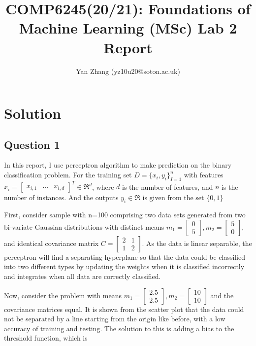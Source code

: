 \documentclass[10pt]{article}
\begin{document}
\title{\huge{COMP6245(20/21): Foundations of Machine Learning (MSc) Lab 2 Report}}
\author{\normalsize{Yan Zhang (yz10u20@soton.ac.uk)}}
\date{}
\maketitle

\section{Solution}
\subsection{Question 1}
In this report, I use perceptron algorithm to make prediction on the binary classification problem. For the training set $ D = \big\{x_i,y_i\big\} _{I=1}^{n}$ with features $x_i =  \begin{bmatrix}x_{i,1}&... &x_{i,d}  \end{bmatrix}^T \in  \Re ^d$, where $d$ is the number of features, and $n$ is the number of instances. And the outputs $y_i \in \Re$ is given from the set $\big\{0,1\big\}$

First, consider sample with n=100 comprising two data sets generated from two bi-variate Gaussian distributions with distinct means $m_1 = \begin{bmatrix}0 \\ 5\end{bmatrix}, m_2= \begin{bmatrix}5 \\ 0 \end{bmatrix}$, and identical covariance matrix $C = \begin{bmatrix} 2 & 1\\ 1 & 2\end{bmatrix}$. As the data is linear separable, the perceptron will find a separating hyperplane so that the data could be classified into two different types by updating the weights when it is classified incorrectly and integrates when all data are correctly classified.   

 Now, consider the problem with means $m_1 = \begin{bmatrix}2.5 \\ 2.5\end{bmatrix}, m_2= \begin{bmatrix}10 \\ 10 \end{bmatrix}$ and the covariance matrices equal. It is shown from the scatter plot that the data could not be separated by a line starting from the origin like before, with a low accuracy of training and testing. The solution to this is adding a bias to the threshold function, which is
\end{document}
